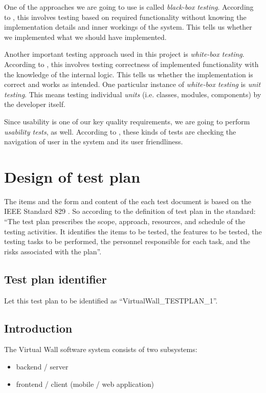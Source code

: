 \documentclass[11pt]{book}
\begin{document}
One of the approaches we are going to use is called \emph{black-box testing}. According to \cite{shinde}, this involves testing based on required functionality without knowing the implementation details and inner workings of the system. This tells us whether we implemented what we should have implemented.

Another important testing approach used in this project is \emph{white-box testing}. According to \cite{shinde}, this involves testing correctness of implemented functionality with the knowledge of the internal logic. This tells us whether the implementation is correct and works as intended. One particular instance of \emph{white-box testing} is \emph{unit testing}. This means testing individual \emph{units} (i.e. classes, modules, components) by the developer itself.

Since usability is one of our key quality requirements, we are going to perform \emph{usability tests}, as well. According to \cite{shinde}, these kinds of tests are checking the navigation of user in the system and its user friendliness.

\section{Design of test plan}

The items and the form and content of the each test document is based on the IEEE Standard 829 \cite{ieee829}. So according to the definition of test plan in the standard: ``The test plan prescribes the scope, approach, resources, and schedule of the testing activities. It identifies the items to be tested, the features to be tested, the testing tasks to be performed, the personnel responsible for each task, and the risks associated with the plan''.

\subsection{Test plan identifier}
Let this test plan to be identified as ``VirtualWall\_TESTPLAN\_1''.

\subsection{Introduction}
The Virtual Wall software system consists of two subsystems:

\begin{itemize}
    \item backend / server
    \item frontend / client (mobile / web application)
\end{itemize}
\end{document}
